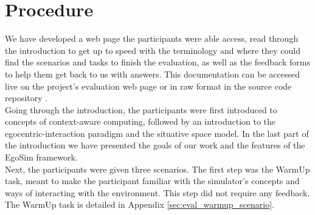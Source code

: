 \section{Procedure} %
\label{sec:eval_procedure}
We have developed a web page the participants were able access, read through the introduction to get up to speed with the terminology and where they could find the scenarios and tasks to finish the evaluation, as well as the feedback forms to help them get back to us with answers. This documentation can be accessed live on the project's evaluation web page \cite{evaluation:online} or in raw format in the source code repository \cite{evaluation:src}.\\

Going through the introduction, the participants were first introduced to concepts of context-aware computing, followed by an introduction to the egocentric-interaction paradigm and the situative space model. In the last part of the introduction we have presented the goals of our work and the features of the EgoSim framework.\\

Next, the participants were given three scenarios. The first step was the WarmUp task, meant to make the participant familiar with the simulator's concepts and ways of interacting with the environment. This step did not require any feedback. The WarmUp task is detailed in Appendix \ref{sec:eval_warmup_scenario}.\\



